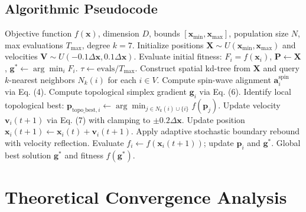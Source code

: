 \documentclass[journal]{IEEEtran}
\begin{document}
\subsection{Algorithmic Pseudocode}
\begin{algorithm}[H]
\caption{Starling Murmuration Topological Search (SMTS)}
\label{alg:smts}
\begin{algorithmic}[1]
\REQUIRE Objective function $f(\mathbf{x})$, dimension $D$, bounds $[\mathbf{x}_{\min}, \mathbf{x}_{\max}]$, population size $N$, max evaluations $T_{\max}$, degree $k=7$.
\STATE Initialize positions $\mathbf{X} \sim U(\mathbf{x}_{\min}, \mathbf{x}_{\max})$ and velocities $\mathbf{V} \sim U(-0.1\Delta \mathbf{x}, 0.1\Delta \mathbf{x})$.
\STATE Evaluate initial fitness: $F_i = f(\mathbf{x}_i)$, $\mathbf{P} \leftarrow \mathbf{X}$, $\mathbf{g}^* \leftarrow \arg\min_i F_i$.
    \STATE $\tau \leftarrow \text{evals} / T_{\max}$.
    \STATE Construct spatial kd-tree from $\mathbf{X}$ and query $k$-nearest neighbors $N_k(i)$ for each $i \in V$.
        \STATE Compute spin-wave alignment $\mathbf{a}_i^{\text{spin}}$ via Eq. (4).
        \STATE Compute topological simplex gradient $\mathbf{g}_i$ via Eq. (6).
        \STATE Identify local topological best: $\mathbf{p}_{\text{topo\_best}, i} \leftarrow \arg\min_{j \in N_k(i) \cup \{i\}} f(\mathbf{p}_j)$.
        \STATE Update velocity $\mathbf{v}_i(t+1)$ via Eq. (7) with clamping to $\pm 0.2 \Delta \mathbf{x}$.
        \STATE Update position $\mathbf{x}_i(t+1) \leftarrow \mathbf{x}_i(t) + \mathbf{v}_i(t+1)$.
        \STATE Apply adaptive stochastic boundary rebound with velocity reflection.
        \STATE Evaluate $f_i \leftarrow f(\mathbf{x}_i(t+1))$; update $\mathbf{p}_i$ and $\mathbf{g}^*$.
    \ENDFOR
\ENDWHILE
\RETURN Global best solution $\mathbf{g}^*$ and fitness $f(\mathbf{g}^*)$.
\end{algorithmic}
\end{algorithm}

\section{Theoretical Convergence Analysis}
\end{document}
